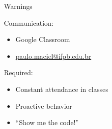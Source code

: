 
\begin{frame}{Warnings}
    \begin{block}{Communication:}
        \begin{itemize}
            \item Google Classroom
            \item \href{mailto:paulo.maciel@ifpb.edu.br}{paulo.maciel@ifpb.edu.br}
        \end{itemize}
    \end{block}
    \begin{block}{Required:}
        \begin{itemize}
            \item Constant attendance in classes
            \item Proactive behavior
            \item ``Show me the code!''
        \end{itemize}
    \end{block}
\end{frame}